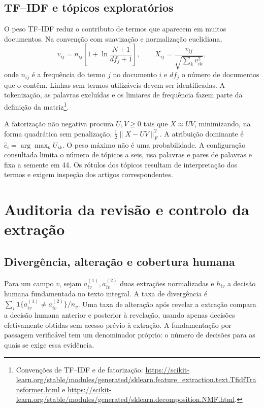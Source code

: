 \subsection{TF--IDF e tópicos exploratórios}
\label{sec:mat-topicos}
O peso TF--IDF reduz o contributo de termos que aparecem em muitos documentos. Na convenção com suavização e normalização euclidiana,
\begin{equation}
v_{ij}=n_{ij}\left[1+\ln\frac{N+1}{df_j+1}\right],
\qquad X_{ij}=\frac{v_{ij}}{\sqrt{\sum_kv_{ik}^2}},
\label{eq:mat-tfidf}
\end{equation}
onde $n_{ij}$ é a frequência do termo $j$ no documento $i$ e $df_j$ o número de documentos que o contêm. Linhas sem termos utilizáveis devem ser identificadas. A tokenização, as palavras excluídas e os limiares de frequência fazem parte da definição da matriz\footnote{Convenções de TF--IDF e de fatorização: \url{https://scikit-learn.org/stable/modules/generated/sklearn.feature_extraction.text.TfidfTransformer.html} e \url{https://scikit-learn.org/stable/modules/generated/sklearn.decomposition.NMF.html}.}.

A fatorização não negativa procura $U,V\geq0$ tais que $X\approx UV$, minimizando, na forma quadrática sem penalização, $\tfrac12\|X-UV\|_F^2$. A atribuição dominante é $\widehat c_i=\arg\max_kU_{ik}$. O peso máximo não é uma probabilidade. A configuração consultada limita o número de tópicos a seis, usa palavras e pares de palavras e fixa a semente em 44. Os rótulos dos tópicos resultam de interpretação dos termos e exigem inspeção dos artigos correspondentes.


\section{Auditoria da revisão e controlo da extração}
\label{sec:mat-auditoria-revisao}

\subsection{Divergência, alteração e cobertura humana}
\label{sec:mat-auditoria-taxas}
Para um campo $v$, sejam $a_{iv}^{(1)},a_{iv}^{(2)}$ duas extrações normalizadas e $h_{iv}$ a decisão humana fundamentada no texto integral. A taxa de divergência é $\sum_i\mathbf1\{a_{iv}^{(1)}\neq a_{iv}^{(2)}\}/n_v$. Uma taxa de alteração após revelar a extração compara a decisão humana anterior e posterior à revelação, usando apenas decisões efetivamente obtidas sem acesso prévio à extração. A fundamentação por passagem verificável tem um denominador próprio: o número de decisões para as quais se exige essa evidência.

